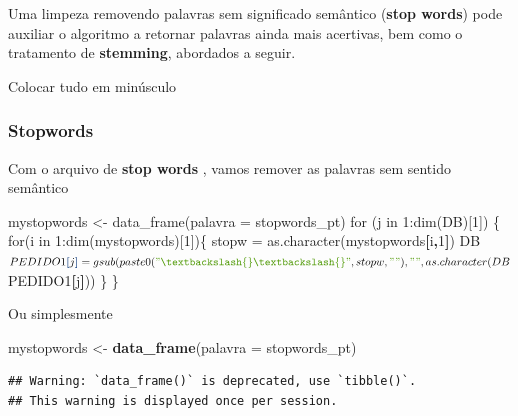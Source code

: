 \documentclass[]{article}
\newenvironment{Shaded}{\begin{snugshade}}{\end{snugshade}}
\newcommand{\AttributeTok}[1]{\textcolor[rgb]{0.77,0.63,0.00}{#1}}
\newcommand{\DataTypeTok}[1]{\textcolor[rgb]{0.13,0.29,0.53}{#1}}
\newcommand{\FunctionTok}[1]{\textcolor[rgb]{0.00,0.00,0.00}{#1}}
\newcommand{\KeywordTok}[1]{\textcolor[rgb]{0.13,0.29,0.53}{\textbf{#1}}}
\newcommand{\NormalTok}[1]{#1}
\newcommand{\OperatorTok}[1]{\textcolor[rgb]{0.81,0.36,0.00}{\textbf{#1}}}
\newcommand{\StringTok}[1]{\textcolor[rgb]{0.31,0.60,0.02}{#1}}
\begin{document}
Uma limpeza removendo palavras sem significado semântico (\textbf{stop
words}) pode auxiliar o algoritmo a retornar palavras ainda mais
acertivas, bem como o tratamento de \textbf{stemming}, abordados a
seguir.

Colocar tudo em minúsculo

\begin{Shaded}
\end{Shaded}

\hypertarget{stopwords}{%
\subsubsection{Stopwords}\label{stopwords}}

Com o arquivo de \textbf{stop words} , vamos remover as palavras sem
sentido semântico

\begin{Shaded}
\begin{Highlighting}[]
\NormalTok{mystopwords <- data_frame(palavra = stopwords_pt)}
\FunctionTok{for (j in 1:}\AttributeTok{dim(DB)[1]) \{}
  \FunctionTok{for(i in 1:}\AttributeTok{dim(mystopwords)[1])\{}
\NormalTok{  stopw = as.character(mystopwords}\KeywordTok{[}\NormalTok{i}\KeywordTok{,}\NormalTok{1}\KeywordTok{]}\NormalTok{)}
\NormalTok{  DB$PEDIDO1}\KeywordTok{[}\NormalTok{j}\KeywordTok{]}\NormalTok{ = gsub(paste0(}\StringTok{"\textbackslash{}\textbackslash{} "}\NormalTok{,stopw,}\StringTok{" "}\NormalTok{), }\StringTok{" "}\NormalTok{, as.character(DB$PEDIDO1}\KeywordTok{[}\NormalTok{j}\KeywordTok{]}\NormalTok{))}
\NormalTok{\}}
\NormalTok{\}}
\end{Highlighting}
\end{Shaded}

Ou simplesmente

\begin{Shaded}
\begin{Highlighting}[]
\NormalTok{mystopwords <-}\StringTok{ }\KeywordTok{data_frame}\NormalTok{(}\DataTypeTok{palavra =}\NormalTok{ stopwords_pt)}
\end{Highlighting}
\end{Shaded}

\begin{verbatim}
## Warning: `data_frame()` is deprecated, use `tibble()`.
## This warning is displayed once per session.
\end{verbatim}
\end{document}
